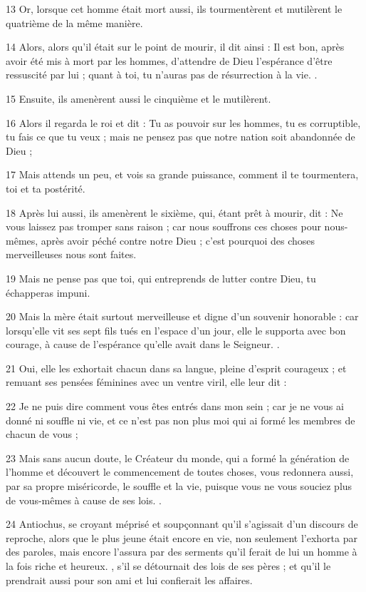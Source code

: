 \par 13 Or, lorsque cet homme était mort aussi, ils tourmentèrent et mutilèrent le quatrième de la même manière.
\par 14 Alors, alors qu'il était sur le point de mourir, il dit ainsi : Il est bon, après avoir été mis à mort par les hommes, d'attendre de Dieu l'espérance d'être ressuscité par lui ; quant à toi, tu n'auras pas de résurrection à la vie. .
\par 15 Ensuite, ils amenèrent aussi le cinquième et le mutilèrent.
\par 16 Alors il regarda le roi et dit : Tu as pouvoir sur les hommes, tu es corruptible, tu fais ce que tu veux ; mais ne pensez pas que notre nation soit abandonnée de Dieu ;
\par 17 Mais attends un peu, et vois sa grande puissance, comment il te tourmentera, toi et ta postérité.
\par 18 Après lui aussi, ils amenèrent le sixième, qui, étant prêt à mourir, dit : Ne vous laissez pas tromper sans raison ; car nous souffrons ces choses pour nous-mêmes, après avoir péché contre notre Dieu ; c'est pourquoi des choses merveilleuses nous sont faites.
\par 19 Mais ne pense pas que toi, qui entreprends de lutter contre Dieu, tu échapperas impuni.
\par 20 Mais la mère était surtout merveilleuse et digne d'un souvenir honorable : car lorsqu'elle vit ses sept fils tués en l'espace d'un jour, elle le supporta avec bon courage, à cause de l'espérance qu'elle avait dans le Seigneur. .
\par 21 Oui, elle les exhortait chacun dans sa langue, pleine d'esprit courageux ; et remuant ses pensées féminines avec un ventre viril, elle leur dit :
\par 22 Je ne puis dire comment vous êtes entrés dans mon sein ; car je ne vous ai donné ni souffle ni vie, et ce n'est pas non plus moi qui ai formé les membres de chacun de vous ;
\par 23 Mais sans aucun doute, le Créateur du monde, qui a formé la génération de l'homme et découvert le commencement de toutes choses, vous redonnera aussi, par sa propre miséricorde, le souffle et la vie, puisque vous ne vous souciez plus de vous-mêmes à cause de ses lois. .
\par 24 Antiochus, se croyant méprisé et soupçonnant qu'il s'agissait d'un discours de reproche, alors que le plus jeune était encore en vie, non seulement l'exhorta par des paroles, mais encore l'assura par des serments qu'il ferait de lui un homme à la fois riche et heureux. , s'il se détournait des lois de ses pères ; et qu'il le prendrait aussi pour son ami et lui confierait les affaires.
